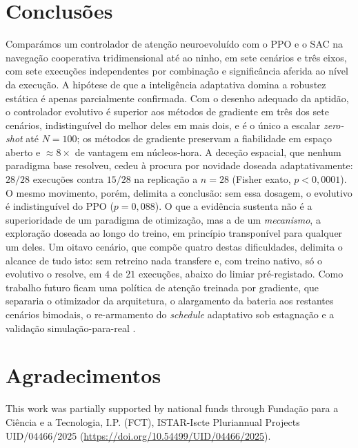 \documentclass[final,5p,times,twocolumn,authoryear]{elsarticle}
\begin{document}
\section{Conclusões}
\label{sec:conclusions}
 Comparámos um controlador de atenção neuroevoluído com o PPO e o SAC na navegação
cooperativa tridimensional até ao ninho, em sete cenários e três eixos, com sete execuções
independentes por combinação e significância aferida ao nível da execução. A
hipótese de que a inteligência adaptativa domina a robustez estática é apenas
parcialmente confirmada. Com o desenho adequado da aptidão, o controlador
evolutivo é superior aos métodos de gradiente em três dos sete cenários,
indistinguível do melhor deles em mais dois, e é o único a escalar
\emph{zero-shot} até $N=100$; os métodos de gradiente preservam a fiabilidade em
espaço aberto e $\approx 8\times$ de vantagem em núcleos-hora. A deceção espacial,
que nenhum paradigma base resolveu, cedeu à procura por novidade doseada
adaptativamente: $28/28$ execuções contra $15/28$ na replicação a $n=28$
(Fisher exato, $p<0{,}0001$). O mesmo movimento, porém, delimita a conclusão: sem
essa dosagem, o evolutivo é indistinguível do PPO ($p=0{,}088$). O que a evidência
sustenta não é a superioridade de um paradigma de otimização, mas a de um
\emph{mecanismo}, a exploração doseada ao longo do treino, em princípio
transponível para qualquer um deles. Um oitavo cenário, que compõe quatro destas
dificuldades, delimita o alcance de tudo isto: sem retreino nada transfere e, com
treino nativo, só o evolutivo o resolve, em $4$ de $21$ execuções, abaixo do
limiar pré-registado. Como trabalho futuro ficam uma política de
atenção treinada por gradiente, que separaria o otimizador da arquitetura, o
alargamento da bateria aos restantes cenários bimodais, o re-armamento do
\emph{schedule} adaptativo sob estagnação e a validação
simulação-para-real \citep{tobin2017domain}.

\section*{Agradecimentos}
This work was partially supported by national funds through Funda\c{c}\~ao para a
Ci\^encia e a Tecnologia, I.P. (FCT), ISTAR-Iscte Pluriannual Projects UID/04466/2025
(\url{https://doi.org/10.54499/UID/04466/2025}).

\let\oldthebibliography\thebibliography
\renewcommand{\thebibliography}[1]{\oldthebibliography{#1}\footnotesize}
\setlength{\bibsep}{0pt plus 0.3ex}



\end{document}
